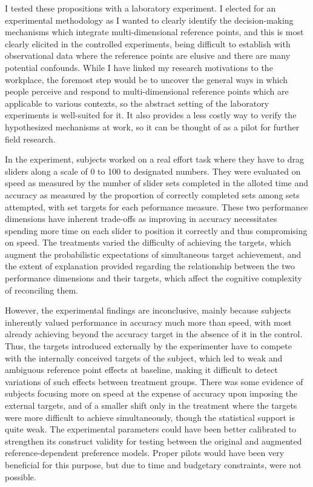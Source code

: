 \documentclass[
  12,
  letterpaper,
  DIV=11,
  numbers=noendperiod]{scrartcl}
\begin{document}
I tested these propositions with a laboratory experiment. I elected for
an experimental methodology as I wanted to clearly identify the
decision-making mechanisms which integrate multi-dimensional reference
points, and this is most clearly elicited in the controlled experiments,
being difficult to establish with observational data where the reference
points are elusive and there are many potential confounds. While I have
linked my research motivations to the workplace, the foremost step would
be to uncover the general ways in which people perceive and respond to
multi-dimensional reference points which are applicable to various
contexts, so the abstract setting of the laboratory experiments is
well-suited for it. It also provides a less costly way to verify the
hypothesized mechanisms at work, so it can be thought of as a pilot for
further field research.

In the experiment, subjects worked on a real effort task where they have
to drag sliders along a scale of 0 to 100 to designated numbers. They
were evaluated on speed as measured by the number of slider sets
completed in the alloted time and accuracy as measured by the proportion
of correctly completed sets among sets attempted, with set targets for
each peformance measure. These two performance dimensions have inherent
trade-offs as improving in accuracy necessitates spending more time on
each slider to position it correctly and thus compromising on speed. The
treatments varied the difficulty of achieving the targets, which augment
the probabilistic expectations of simultaneous target achievement, and
the extent of explanation provided regarding the relationship between
the two performance dimensions and their targets, which affect the
cognitive complexity of reconciling them.

However, the experimental findings are inconclusive, mainly because
subjects inherently valued performance in accuracy much more than speed,
with most already achieving beyond the accuracy target in the absence of
it in the control. Thus, the targets introduced externally by the
experimenter have to compete with the internally conceived targets of
the subject, which led to weak and ambiguous reference point effects at
baseline, making it difficult to detect variations of such effects
between treatment groups. There was some evidence of subjects focusing
more on speed at the expense of accuracy upon imposing the external
targets, and of a smaller shift only in the treatment where the targets
were more difficult to achieve simultaneously, though the statistical
support is quite weak. The experimental parameters could have been
better calibrated to strengthen its construct validity for testing
between the original and augmented reference-dependent preference
models. Proper pilots would have been very beneficial for this purpose,
but due to time and budgetary constraints, were not possible.
\end{document}
